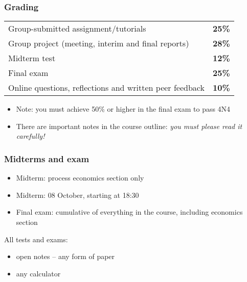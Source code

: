 \begin{frame}\frametitle{Grading}
	\begin{tabular}{lc}
		Group-submitted assignment/tutorials 					& \textbf{25\%} \\
		Group project (meeting, interim and final reports)		& \textbf{28\%} \\
		Midterm test											& \textbf{12\%} \\
		Final exam												& \textbf{25\%} \\
		Online questions, reflections and written peer feedback	& \textbf{10\%}
	\end{tabular}

	\vspace{24pt}
	\begin{itemize}
		\item	Note: you must achieve 50\% or higher in the final exam to pass 4N4
		\item	There are important notes in the course outline: \emph{{\color{myOrange}you must please read it carefully!}}
	\end{itemize}

\end{frame}

\begin{frame}\frametitle{Midterms and exam}

	\begin{itemize}
		\item	Midterm: process economics section only
		\item	Midterm: 08 October, starting at 18:30
		
		\vspace{12pt}
		\item	Final exam: cumulative of everything in the course, including economics section
	\end{itemize}

	\vspace{24pt}
	All tests and exams:
	\begin{itemize}
		\item	open notes -- any form of paper
		\item	any calculator
	\end{itemize}
\end{frame}

